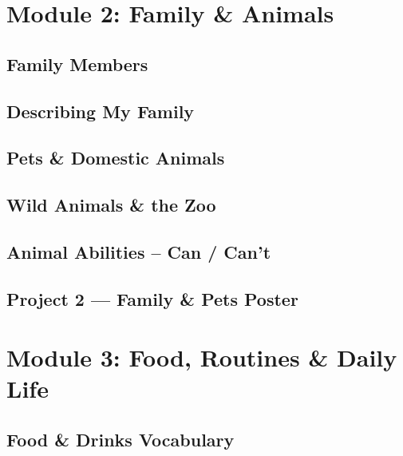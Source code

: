 \clearpage
{}
\part{Module 2: Family \& Animals}
\newpage
\chapter{Family Members}\label{ch:s07}

\newpage
\chapter{Describing My Family}\label{ch:s08}

\newpage
\chapter{Pets \& Domestic Animals}\label{ch:s09}

\newpage
\chapter{Wild Animals \& the Zoo}\label{ch:s10}

\newpage
\chapter{Animal Abilities -- Can / Can't}\label{ch:s11}

\newpage
\chapter{Project 2 --- Family \& Pets Poster}\label{ch:s12}


\clearpage
{}
\part{Module 3: Food, Routines \& Daily Life}
\newpage
\chapter{Food \& Drinks Vocabulary}\label{ch:s13}

\newpage

